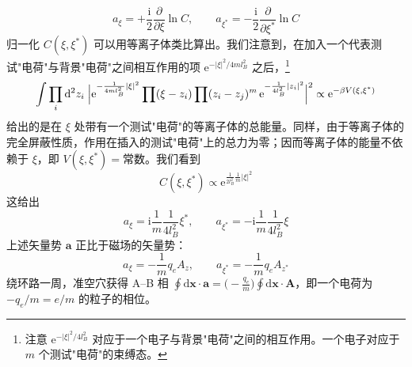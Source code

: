 \begin{equation*}
a_\xi=+\frac{\mathrm{i}}{2}\frac{\partial}{\partial\xi}\ln C,\qquad a_{\xi^*}=-\frac{\mathrm{i}}{2}\frac{\partial}{\partial\xi^*}\ln C
\end{equation*}
归一化 $C(\xi,\xi^*)$ 可以用等离子体类比算出。我们注意到，在加入一个代表测试"电荷"与背景"电荷"之间相互作用的项 $\mathrm{e}^{-|\xi|^2/4ml_B^2}$ 之后，\footnote{注意 $\mathrm{e}^{-|\xi|^2/4l_B^2}$ 对应于一个电子与背景"电荷"之间的相互作用。一个电子对应于 $m$ 个测试"电荷"的束缚态。}
\begin{equation*}
\int\prod_i\mathrm{d}^2z_i\;\Bigl|\mathrm{e}^{-\frac{1}{4ml_B^2}|\xi|^2}\prod(\xi-z_i)\prod(z_i-z_j)^m\,\mathrm{e}^{-\frac{1}{4l_B^2}|z_i|^2}\Bigr|^2\propto\mathrm{e}^{-\beta V(\xi,\xi^*)}
\end{equation*}
给出的是在 $\xi$ 处带有一个测试"电荷"的等离子体的总能量。同样，由于等离子体的完全屏蔽性质，作用在插入的测试"电荷"上的总力为零；因而等离子体的能量不依赖于 $\xi$，即 $V(\xi,\xi^*)=\text{常数}$。我们看到
\begin{equation*}
C(\xi,\xi^*)\propto\mathrm{e}^{\frac{1}{2l_B^2}\frac{1}{m}|\xi|^2}
\end{equation*}
这给出
\begin{equation*}
a_\xi=\mathrm{i}\frac{1}{m}\frac{1}{4l_B^2}\xi^*,\qquad a_{\xi^*}=-\mathrm{i}\frac{1}{m}\frac{1}{4l_B^2}\xi
\end{equation*}
上述矢量势 $\pmb{a}$ 正比于磁场的矢量势：
\begin{equation*}
a_\xi=-\frac{1}{m}q_eA_z,\qquad a_{\xi^*}=-\frac{1}{m}q_eA_{z^*}
\end{equation*}
绕环路一周，准空穴获得 A--B 相 $\oint\mathrm{d}\pmb{x}\cdot\pmb{a}=\bigl(-\frac{q_e}{m}\bigr)\oint\mathrm{d}\pmb{x}\cdot\pmb{A}$，即一个电荷为 $-q_e/m=e/m$ 的粒子的相位。


